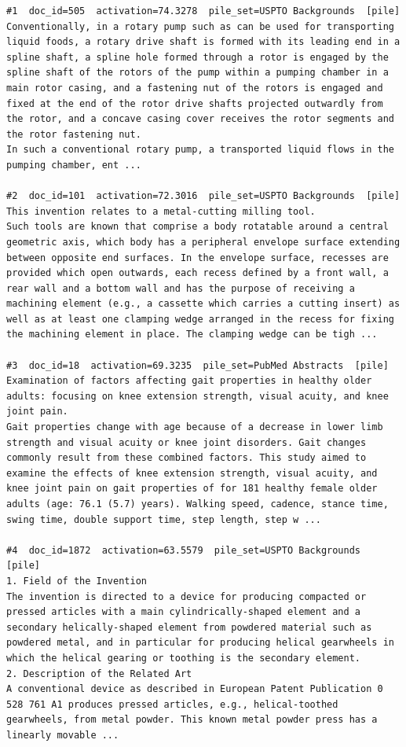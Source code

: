 \begin{verbatim}
#1  doc_id=505  activation=74.3278  pile_set=USPTO Backgrounds  [pile]
Conventionally, in a rotary pump such as can be used for transporting liquid foods, a rotary drive shaft is formed with its leading end in a spline shaft, a spline hole formed through a rotor is engaged by the spline shaft of the rotors of the pump within a pumping chamber in a main rotor casing, and a fastening nut of the rotors is engaged and fixed at the end of the rotor drive shafts projected outwardly from the rotor, and a concave casing cover receives the rotor segments and the rotor fastening nut.
In such a conventional rotary pump, a transported liquid flows in the pumping chamber, ent ...

#2  doc_id=101  activation=72.3016  pile_set=USPTO Backgrounds  [pile]
This invention relates to a metal-cutting milling tool.
Such tools are known that comprise a body rotatable around a central geometric axis, which body has a peripheral envelope surface extending between opposite end surfaces. In the envelope surface, recesses are provided which open outwards, each recess defined by a front wall, a rear wall and a bottom wall and has the purpose of receiving a machining element (e.g., a cassette which carries a cutting insert) as well as at least one clamping wedge arranged in the recess for fixing the machining element in place. The clamping wedge can be tigh ...

#3  doc_id=18  activation=69.3235  pile_set=PubMed Abstracts  [pile]
Examination of factors affecting gait properties in healthy older adults: focusing on knee extension strength, visual acuity, and knee joint pain.
Gait properties change with age because of a decrease in lower limb strength and visual acuity or knee joint disorders. Gait changes commonly result from these combined factors. This study aimed to examine the effects of knee extension strength, visual acuity, and knee joint pain on gait properties of for 181 healthy female older adults (age: 76.1 (5.7) years). Walking speed, cadence, stance time, swing time, double support time, step length, step w ...

#4  doc_id=1872  activation=63.5579  pile_set=USPTO Backgrounds  [pile]
1. Field of the Invention
The invention is directed to a device for producing compacted or pressed articles with a main cylindrically-shaped element and a secondary helically-shaped element from powdered material such as powdered metal, and in particular for producing helical gearwheels in which the helical gearing or toothing is the secondary element.
2. Description of the Related Art
A conventional device as described in European Patent Publication 0 528 761 A1 produces pressed articles, e.g., helical-toothed gearwheels, from metal powder. This known metal powder press has a linearly movable ...


\end{verbatim}
